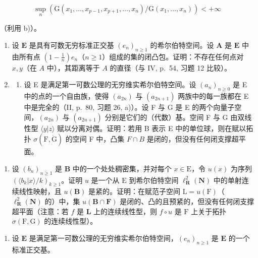 \[
\sup _ {n} \left(\mathrm{G} \left(x _ {1}, \dots , x _ {p - 1}, x _ {p + 1}, \dots , x _ {n}\right) / \mathrm{G} \left(x _ {1}, \dots , x _ {n}\right)\right) <   + \infty
\]

（利用 b)）。

\begin{enumerate}
\def\labelenumi{\arabic{enumi})}
\setcounter{enumi}{7}
\item
  设 \(\mathbf{E}\) 是具有可数无穷标准正交基 \((e_n)_{n\geq 1}\) 的希尔伯特空间。设 \(\mathbf{A}\) 是 \(\mathbf{E}\) 中由所有点 \(\left(1 - \frac{1}{n}\right)e_n\)（\(n \geqslant 1\)）组成的集的闭凸包。证明：不存在任何点对 \(x, y\)（在 \(A\) 中），其距离等于 \(A\) 的直径（与 IV, p.~54, 习题 12 比较）。
\item
  \begin{enumerate}
  \def\labelenumii{\alph{enumii})}
  \tightlist
  \item
    设 E 是满足第一可数公理的无穷维实希尔伯特空间。设 \((a_{n})_{n\geqslant0}\) 是 E 中的点的一个自由族，使得 \((a_{2n})\) 与 \((a_{2n+1})\) 两族中的每一族都在 E 中是完全的（II, p.~80, 习题 26, a)）。设 F 与 G 是 E 的两个向量子空间，\((a_{2n})\) 与 \((a_{2n+1})\) 分别是它们的（代数）基。空间 F 与 G 由双线性型 \(\langle y|z\rangle\) 赋以分离对偶。证明：若用 B 表示 E 中的单位球，则在赋以拓扑 \(\sigma(\mathrm{F},\dot{\mathrm{G}})\) 的空间 F 中，凸集 \(F\cap B\) 是闭的，但没有任何闭支撑超平面。
  \end{enumerate}
\end{enumerate}

\begin{enumerate}
\def\labelenumi{\alph{enumi})}
\setcounter{enumi}{1}
\tightlist
\item
  设 \((b_n)_{n\geqslant 1}\) 是 \(\mathbf{B}\) 中的一个处处稠密集，并对每个 \(x\in \mathrm{E}\)，令 \(u(x)\) 为序列 \((\langle b_k|x\rangle /k)_{k\geqslant 1}\)。证明 \(u\) 是一个从 \(\mathrm{E}\) 到希尔伯特空间 \(\ell_{\mathbf{R}}^2 (\mathbf{N})\) 中的单射连续线性映射，且 \(u(\mathbf{B})\) 是紧的。证明：在赋范子空间 \(\mathrm{L} = u(\mathrm{F})\)（\(\ell_{\mathbf{R}}^2 (\mathbf{N})\) 的）中，集 \(u(\mathbf{B}\cap \mathbf{F})\) 是闭的、凸的且预紧的，但没有任何闭支撑超平面（注意：若 \(f\) 是 \(\mathbf{L}\) 上的连续线性型，则 \(f\circ u\) 是 \(\mathrm{F}\) 上关于拓扑 \(\sigma (\mathrm{F},\mathrm{G})\) 的连续线性型）。
\end{enumerate}

\begin{enumerate}
\def\labelenumi{\arabic{enumi})}
\setcounter{enumi}{9}
\tightlist
\item
  设 \(\mathbf{E}\) 是满足第一可数公理的无穷维实希尔伯特空间，\((e_n)_{n\geqslant 1}\) 是 \(\mathbf{E}\) 的一个标准正交基。
\end{enumerate}

